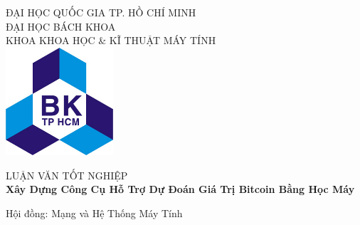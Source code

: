 


\begin{titlepage}

\newcommand{\HRule}{\rule{\linewidth}{0.5mm}} %

\center %
 

\textsc{\Large ĐẠI HỌC QUỐC GIA TP. HỒ CHÍ MINH}\\[0.25cm] %
\textsc{\Large ĐẠI HỌC BÁCH KHOA}\\[0.25cm] %
\textsc{\large KHOA KHOA HỌC \& KĨ THUẬT MÁY TÍNH}\\[0.4cm] %
\vspace{1cm}
\includegraphics[width=0.3\textwidth]{BK.jpg}\\[0.4cm]
\vspace{1cm}

\textsc{\Large{LUẬN VĂN TỐT NGHIỆP}}\\[0.5cm] 

{ \Large \bfseries Xây Dựng Công Cụ Hỗ Trợ Dự Đoán Giá Trị Bitcoin Bằng Học Máy}\\[0.7cm] %
\begin{flushright}
\vspace{1cm}
\large Hội đồng: Mạng và Hệ Thống Máy Tính
\vspace{1cm}
\end{flushright}
 


\end{titlepage}
